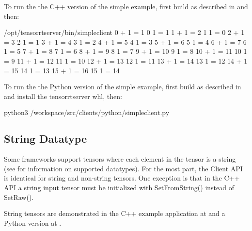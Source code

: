 \documentclass[letterpaper,10pt,english]{sphinxmanual}
\begin{document}
To run the the C++ version of the simple example, first build as
described in {\hyperref[\detokenize{client:section-building-the-client-libraries-and-examples}]{}}
and then:

\begin{sphinxVerbatim}[commandchars=\\\{\}]
\PYGZdl{} /opt/tensorrtserver/bin/simple\PYGZus{}client
0 + 1 = 1
0 \PYGZhy{} 1 = \PYGZhy{}1
1 + 1 = 2
1 \PYGZhy{} 1 = 0
2 + 1 = 3
2 \PYGZhy{} 1 = 1
3 + 1 = 4
3 \PYGZhy{} 1 = 2
4 + 1 = 5
4 \PYGZhy{} 1 = 3
5 + 1 = 6
5 \PYGZhy{} 1 = 4
6 + 1 = 7
6 \PYGZhy{} 1 = 5
7 + 1 = 8
7 \PYGZhy{} 1 = 6
8 + 1 = 9
8 \PYGZhy{} 1 = 7
9 + 1 = 10
9 \PYGZhy{} 1 = 8
10 + 1 = 11
10 \PYGZhy{} 1 = 9
11 + 1 = 12
11 \PYGZhy{} 1 = 10
12 + 1 = 13
12 \PYGZhy{} 1 = 11
13 + 1 = 14
13 \PYGZhy{} 1 = 12
14 + 1 = 15
14 \PYGZhy{} 1 = 13
15 + 1 = 16
15 \PYGZhy{} 1 = 14
\end{sphinxVerbatim}

To run the the Python version of the simple example, first build as
described in {\hyperref[\detokenize{client:section-building-the-client-libraries-and-examples}]{}}
and install the tensorrtserver whl, then:

\begin{sphinxVerbatim}[commandchars=\\\{\}]
\PYGZdl{} python3 /workspace/src/clients/python/simple\PYGZus{}client.py
\end{sphinxVerbatim}


\subsection{String Datatype}
\label{\detokenize{client:string-datatype}}
Some frameworks support tensors where each element in the tensor is a
string (see {\hyperref[\detokenize{model_configuration:section-datatypes}]{}} for information on supported
datatypes). For the most part, the Client API is identical for string
and non-string tensors. One exception is that in the C++ API a string
input tensor must be initialized with SetFromString() instead of
SetRaw().

String tensors are demonstrated in the C++ example application at
and a Python version at .
\end{document}

